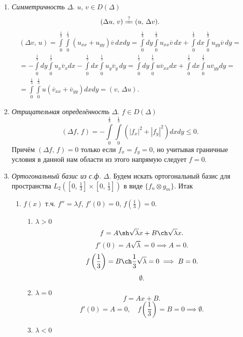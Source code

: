 \documentclass[a4paper]{article}
\begin{document}
\begin{sol}
\begin{enumerate}
	\item \emph{Симметричность} $ \Delta$. $u,\,v \in D(\Delta)$ 
\[
	(\Delta u,\,v)\xlongequal[]{\text{?}}(u,\,\Delta v)
.\]
\begin{multline*}
	(\Delta v,\,u)= \int\limits_{0}^{\frac{1}{3}} \int\limits_{0}^{\frac{1}{3}}   (u_{xx}+u_{yy})\overline{v}\,dxdy=
	\int\limits_{0}^{\frac{1}{3}}dy \int\limits_{0}^{\frac{1}{3}} u_{ x x}\overline{v}\,dx  +\int\limits_{0}^{\frac{1}{3}} dx
	\int\limits_{0}^{\frac{1}{3}} u_{yy}\overline{v} \,dy=\\
	=-\int\limits_{0}^{\frac{1}{3}} dy \int\limits_{0}^{\frac{1}{3}} u_x \overline{v}_xdx
	- \int\limits_{0}^{\frac{1}{3}} dx \int\limits_{0}^{\frac{1}{3}} u_y \overline{v}_y\,dy=
	\int\limits_{0}^{\frac{1}{3}} dy \int\limits_{0}^{\frac{1}{3}} u \overline{v}_{x x} dx+ \int\limits_{0}^{\frac{1}{3}} 
	dx \int\limits_{0}^{\frac{1}{3}} u \overline{v}_{yy}dy =\\
	= \int\limits_{0}^{\frac{1}{3}} \int\limits_{0}^{\frac{1}{3}} u\left(\overline{v}_{x x} +\overline{v}_{yy}\right) dxdy=
	(v,\,\Delta u)
.\end{multline*} 
\item \emph{Отрицательная определённость} $\Delta$. $f \in D(\Delta)$ 
	\[
		(\Delta f,\,f)=
		- \int\limits_{0}^{\frac{1}{3}} \int\limits_{0}^{\frac{1}{3}} (|f_x|^2+|f_y|^2)dxdy\le 0  
	.\]
	Причём $(\Delta f,\,f)=0$ только если $f_x=f_y=0$, но
	учитывая граничные условия в данной нам области из
	этого напрямую следует  $f=0$.
\item \emph{Ортогональный базис из с.ф.} $\Delta$. Будем 
	искать ортогональный базис для пространства
	$\displaystyle L_2 \left( \left[0,\,\frac{1}{3}\right]\times
	\left[ 0,\,\frac{1}{3} \right] \right) $ в виде
	$\{f_n \otimes g_m\} $. Итак
\begin{enumerate}
	\item $f(x)$ т.ч. $f''=\lambda f$, $f'(0)=0$, $\displaystyle f\left( \frac{1}{3} \right) =0$.
\begin{enumerate}
\item $\lambda>0$ 
	\[
	f= A \sh \sqrt{\lambda} x +B \ch \sqrt{\lambda} x
	.\] 
	\[
		f'(0)=A \sqrt{\lambda} =0 \implies A=0
	.\] 
	\[
		f\left( \frac{1}{3} \right) =B \ch \frac{1}{3}\sqrt{\lambda} =0\implies B=0
	.\] 
	\[
	\emptyset
	.\] 
\item $\lambda=0$ 
	\[
	f=Ax+B
	.\] 
	\[
		f'(0)=A=0,\quad f\left( \frac{1}{3} \right) =B=0\implies \emptyset
	.\] 
\item $\lambda <0$ 

\end{enumerate}
\end{enumerate}
\end{enumerate}
\end{sol}
\end{document}
